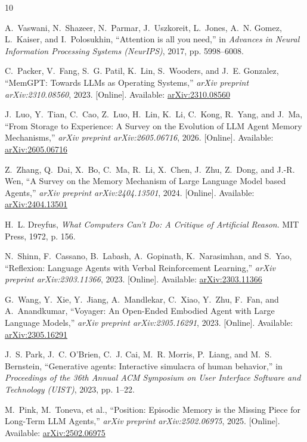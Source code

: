 \documentclass[10pt,journal,compsoc]{IEEEtran}
\begin{document}

\begin{thebibliography}{10}

A.~Vaswani, N.~Shazeer, N.~Parmar, J.~Uszkoreit, L.~Jones, A.~N. Gomez, L.~Kaiser, and I.~Polosukhin, ``Attention is all you need,'' in {\em Advances in Neural Information Processing Systems (NeurIPS)}, 2017, pp. 5998--6008.

C.~Packer, V.~Fang, S.~G. Patil, K.~Lin, S.~Wooders, and J.~E. Gonzalez, ``MemGPT: Towards LLMs as Operating Systems,'' {\em arXiv preprint arXiv:2310.08560}, 2023. [Online]. Available: \href{https://arxiv.org/abs/2310.08560}{arXiv:2310.08560}

J.~Luo, Y.~Tian, C.~Cao, Z.~Luo, H.~Lin, K.~Li, C.~Kong, R.~Yang, and J.~Ma, ``From Storage to Experience: A Survey on the Evolution of LLM Agent Memory Mechanisms,'' {\em arXiv preprint arXiv:2605.06716}, 2026. [Online]. Available: \href{https://arxiv.org/abs/2605.06716}{arXiv:2605.06716}

Z.~Zhang, Q.~Dai, X.~Bo, C.~Ma, R.~Li, X.~Chen, J.~Zhu, Z.~Dong, and J.-R. Wen, ``A Survey on the Memory Mechanism of Large Language Model based Agents,'' {\em arXiv preprint arXiv:2404.13501}, 2024. [Online]. Available: \href{https://arxiv.org/abs/2404.13501}{arXiv:2404.13501}

H.~L. Dreyfus, {\em What Computers Can't Do: A Critique of Artificial Reason}. MIT Press, 1972, p. 156.

N.~Shinn, F.~Cassano, B.~Labash, A.~Gopinath, K.~Narasimhan, and S.~Yao, ``Reflexion: Language Agents with Verbal Reinforcement Learning,'' {\em arXiv preprint arXiv:2303.11366}, 2023. [Online]. Available: \href{https://arxiv.org/abs/2303.11366}{arXiv:2303.11366}

G.~Wang, Y.~Xie, Y.~Jiang, A.~Mandlekar, C.~Xiao, Y.~Zhu, F.~Fan, and A.~Anandkumar, ``Voyager: An Open-Ended Embodied Agent with Large Language Models,'' {\em arXiv preprint arXiv:2305.16291}, 2023. [Online]. Available: \href{https://arxiv.org/abs/2305.16291}{arXiv:2305.16291}

J.~S. Park, J.~C. O'Brien, C.~J. Cai, M.~R. Morris, P.~Liang, and M.~S. Bernstein, ``Generative agents: Interactive simulacra of human behavior,'' in {\em Proceedings of the 36th Annual ACM Symposium on User Interface Software and Technology (UIST)}, 2023, pp. 1--22.

M.~Pink, M.~Toneva, et al., ``Position: Episodic Memory is the Missing Piece for Long-Term LLM Agents,'' {\em arXiv preprint arXiv:2502.06975}, 2025. [Online]. Available: \href{https://arxiv.org/abs/2502.06975}{arXiv:2502.06975}


\end{thebibliography}
\end{document}
